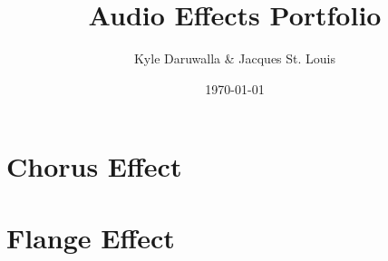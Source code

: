 \documentclass{article}
\title{Audio Effects Portfolio}
\author{Kyle Daruwalla \& Jacques St. Louis}
\date{\today}
\begin{document}
\maketitle

\section{Chorus Effect}


\section{Flange Effect}

\end{document}
